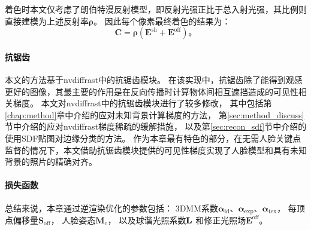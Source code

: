 着色时本文仅考虑了朗伯特漫反射模型，即反射光强正比于总入射光强，其比例则直接建模为上述反射率$\mathbf{\rho}$。
因此每个像素最终着色的结果为：
\begin{equation}
    \mathbf{C} = \mathbf{\rho} \left(\mathbf{E}^\mathrm{sh} + \mathbf{E}^\mathrm{off}\right) \text{。}
\end{equation}

\paragraph{抗锯齿}
本文的方法基于nvdiffrast中的抗锯齿模块。
在该实现中，抗锯齿除了能得到观感更好的图像，其最主要的作用是在反向传播时计算物体间相互遮挡造成的可见性相关梯度。
本文对nvdiffrast中的抗锯齿模块进行了较多修改，
其中包括第\ref{chap:method}章中介绍的应对未知背景计算梯度的方法，
第\ref{sec:method_discuss}节中介绍的应对nvdiffrast梯度稀疏的缓解措施，
以及第\ref{sec:recon_sdf}节中介绍的使用SDF贴图对边缘分类的方法。
作为本章最有特色的部分，在无需人脸关键点监督的情况下，本文借助抗锯齿模块提供的可见性梯度实现了人脸模型和具有未知背景的照片的精确对齐。

\paragraph{损失函数}
总结来说，本章通过逆渲染优化的参数包括：
3DMM系数$\mathbf{\alpha}_\mathrm{id}$、$\mathbf{\alpha}_\mathrm{exp}$、$\mathbf{\alpha}_\mathrm{tex}$，
每顶点偏移量$\mathbf{S}_\mathrm{off}$，
人脸姿态$\mathbf{M}_\mathrm{c}$，
以及球谐光照系数$\mathbf{L}$
和修正光照场$\mathbf{E}^\mathrm{off}$。

